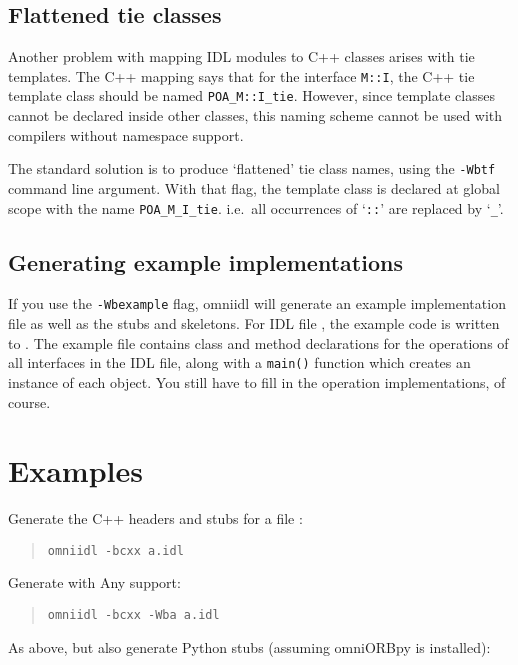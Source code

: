 \documentclass[11pt,twoside,a4paper]{book}
\newcommand{\type}[1]{\texttt{#1}}
\newcommand{\intf}[1]{\texttt{#1}}
\newcommand{\op}[1]{\texttt{#1()}}
\newcommand{\cmdline}[1]{\texttt{#1}}
\newcommand{\file}{\begingroup \urlstyle{tt}\Url}
\begin{document}
\subsection{Flattened tie classes}

Another problem with mapping IDL modules to C++ classes arises with
tie templates. The C++ mapping says that for the interface
\intf{M::I}, the C++ tie template class should be named
\type{POA\_M::I\_tie}. However, since template classes cannot be
declared inside other classes, this naming scheme cannot be used with
compilers without namespace support.

The standard solution is to produce `flattened' tie class names, using
the \cmdline{-Wbtf} command line argument. With that flag, the
template class is declared at global scope with the name
\type{POA\_M\_I\_tie}. i.e.\ all occurrences of `\type{::}' are
replaced by `\type{\_}'.


\subsection{Generating example implementations}

If you use the \cmdline{-Wbexample} flag, omniidl will generate an
example implementation file as well as the stubs and skeletons. For
IDL file \file{foo.idl}, the example code is written to
\file{foo_i.cc}. The example file contains class and method
declarations for the operations of all interfaces in the IDL file,
along with a \op{main} function which creates an instance of each
object. You still have to fill in the operation implementations, of
course.



\section{Examples}

Generate the C++ headers and stubs for a file \file{a.idl}:

\begin{quote}
\cmdline{omniidl -bcxx a.idl}
\end{quote}

\noindent Generate with Any support:

\begin{quote}
\cmdline{omniidl -bcxx -Wba a.idl}
\end{quote}

\noindent As above, but also generate Python stubs (assuming omniORBpy
is installed):
\end{document}
